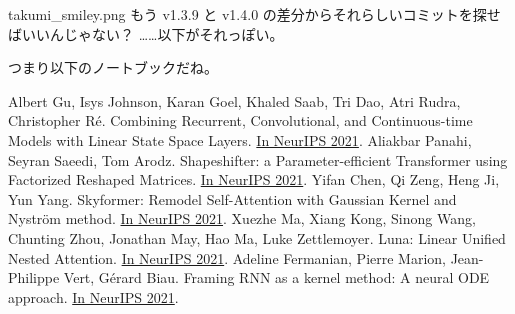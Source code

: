 \documentclass[b5paper,xelatex,ja=standard,10pt]{bxjsarticle}
\begin{document}
\begin{SERIFU}[colback=PaleGold, colbacktitle=PaleGold2]{takumi_smiley.png}
もう v1.3.9 と v1.4.0 の差分からそれらしいコミットを探せばいいんじゃない？ ……以下がそれっぽい。


つまり以下のノートブックだね。

\end{SERIFU}


\clearpage
{}
\begin{thebibliography}{99}
     Albert Gu, Isys Johnson, Karan Goel, Khaled Saab, Tri Dao, Atri Rudra, Christopher Ré. Combining Recurrent, Convolutional, and Continuous-time Models with Linear State Space Layers. {\href{https://proceedings.neurips.cc/paper/2021/hash/05546b0e38ab9175cd905eebcc6ebb76-Abstract.html}{In NeurIPS 2021}}.
     Aliakbar Panahi, Seyran Saeedi, Tom Arodz. Shapeshifter: a Parameter-efficient Transformer using Factorized Reshaped Matrices. {\href{https://proceedings.neurips.cc/paper/2021/hash/09def3ebbc44ff3426b28fcd88c83554-Abstract.html}{In NeurIPS 2021}}.
     Yifan Chen, Qi Zeng, Heng Ji, Yun Yang. Skyformer: Remodel Self-Attention with Gaussian Kernel and Nyström method. {\href{https://proceedings.neurips.cc/paper/2021/hash/10a7cdd970fe135cf4f7bb55c0e3b59f-Abstract.html}{In NeurIPS 2021}}.
     Xuezhe Ma, Xiang Kong, Sinong Wang, Chunting Zhou, Jonathan May, Hao Ma, Luke Zettlemoyer. Luna: Linear Unified Nested Attention. {\href{https://proceedings.neurips.cc/paper/2021/hash/14319d9cfc6123106878dc20b94fbaf3-Abstract.html}{In NeurIPS 2021}}.
     Adeline Fermanian, Pierre Marion, Jean-Philippe Vert, Gérard Biau. Framing RNN as a kernel method: A neural ODE approach. {\href{https://proceedings.neurips.cc/paper/2021/hash/18a9042b3fc5b02fe3d57fea87d6992f-Abstract.html}{In NeurIPS 2021}}.


\end{thebibliography}
\end{document}
